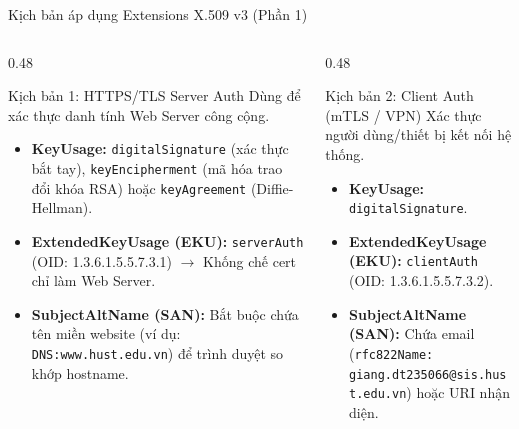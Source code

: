 \documentclass[10pt, aspectratio=169]{beamer}
\begin{document}
\begin{frame}{Kịch bản áp dụng Extensions X.509 v3 (Phần 1)}
    \begin{columns}[onlytextwidth]
        \begin{column}{0.48\textwidth}
            \begin{block}{Kịch bản 1: HTTPS/TLS Server Auth}
                Dùng để xác thực danh tính Web Server công cộng.
                \begin{itemize}
                    \item \textbf{KeyUsage:} \texttt{digitalSignature} (xác thực bắt tay), \texttt{keyEncipherment} (mã hóa trao đổi khóa RSA) hoặc \texttt{keyAgreement} (Diffie-Hellman).
                    \item \textbf{ExtendedKeyUsage (EKU):} \texttt{serverAuth} (OID: 1.3.6.1.5.5.7.3.1) $\rightarrow$ Khống chế cert chỉ làm Web Server.
                    \item \textbf{SubjectAltName (SAN):} Bắt buộc chứa tên miền website (ví dụ: \texttt{DNS:www.hust.edu.vn}) để trình duyệt so khớp hostname.
                \end{itemize}
            \end{block}
        \end{column}
        \begin{column}{0.48\textwidth}
            \begin{block}{Kịch bản 2: Client Auth (mTLS / VPN)}
                Xác thực người dùng/thiết bị kết nối hệ thống.
                \begin{itemize}
                    \item \textbf{KeyUsage:} \texttt{digitalSignature}.
                    \item \textbf{ExtendedKeyUsage (EKU):} \texttt{clientAuth} (OID: 1.3.6.1.5.5.7.3.2).
                    \item \textbf{SubjectAltName (SAN):} Chứa email (\texttt{rfc822Name:}\\\texttt{giang.dt235066@sis.hust.edu.vn}) hoặc URI nhận diện.
                \end{itemize}
            \end{block}
        \end{column}
    \end{columns}
\end{frame}
\end{document}
